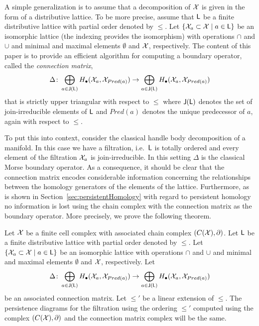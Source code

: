 A simple generalization is to assume that a decomposition of ${\mathcal X}$ is given in the form of a distributive lattice.
To be more precise, assume that ${\mathsf L}$ be a finite distributive lattice with  partial order denoted by $\leq$.
Let $\left\{{{\mathcal X}_a \subset {\mathcal X} \mid a\in {\mathsf L}}\right\}$ be an isomorphic lattice (the indexing provides the isomorphism) with operations $\cap$ and $\cup$ and minimal and maximal elements $\emptyset$ and ${\mathcal X}$, respectively.
The content of this paper is to provide an efficient algorithm for computing a boundary operator, called the \emph{connection matrix},
\begin{equation}
\label{eq:connectionMatrix}
\Delta \colon \bigoplus_{a\in {\mathsf J}({\mathsf L})} H_\bullet({\mathcal X}_a,{\mathcal X}_{Pred(a)}) \to \bigoplus_{a\in {\mathsf J}({\mathsf L})} H_\bullet({\mathcal X}_a,{\mathcal X}_{Pred(a)})
\end{equation}
that is strictly upper triangular with respect to  $\leq$ where ${\mathsf J}({\mathsf L})$ denotes the set of join-irreducible elements of ${\mathsf L}$ and $Pred(a)$ denotes the unique predecessor of $a$, again with respect to $\leq$.

To put this into context, consider the classical handle body decomposition of a manifold.
In this case we have a filtration, i.e.\ ${\mathsf L}$ is totally ordered and every element of the filtration ${\mathcal X}_a$ is join-irreducible.
In this setting $\Delta$ is the classical Morse boundary operator.
As a consequence, it should be clear that the connection matrix encodes considerable information concerning the relationships between the homology generators of the elements of the lattice. 
Furthermore, as is shown in Section~\ref{sec:persistentHomology} with regard to persistent homology no information is lost using the chain complex with the connection matrix as the boundary operator.
More precisely, we prove the following theorem.

\begin{thm}
\label{thm:PH}
Let ${\mathcal X}$ be a finite cell complex with associated chain complex $(C({\mathcal X}),\partial)$.
Let ${\mathsf L}$ be a finite distributive lattice with  partial order denoted by $\leq$.
Let $\left\{{{\mathcal X}_a \subset {\mathcal X} \mid a\in {\mathsf L}}\right\}$ be an isomorphic lattice with operations $\cap$ and $\cup$ and minimal and maximal elements $\emptyset$ and ${\mathcal X}$, respectively.
Let 
\[
\Delta \colon \bigoplus_{a\in {\mathsf J}({\mathsf L})} H_\bullet({\mathcal X}_a,{\mathcal X}_{Pred(a)}) \to \bigoplus_{a\in {\mathsf J}({\mathsf L})} H_\bullet({\mathcal X}_a,{\mathcal X}_{Pred(a)})
\]
be an associated connection matrix.
Let $\leq'$ be a linear extension of $\leq$.
The persistence diagrams for the filtration using the ordering $\leq'$ computed using the complex $(C({\mathcal X}),\partial)$ and the connection matrix complex will be the same.  
\end{thm}

